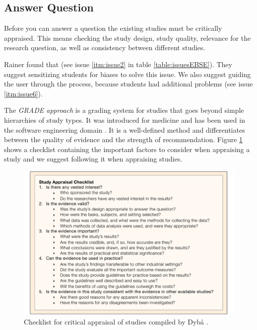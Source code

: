 
\subsection{Answer Question}
\label{subsec:answer question}

Before you can answer a question the existing studies must be critically appraised. This means checking the study design, study quality, relevance for the research question, as well as consistency between different studies. 

Rainer \etal found that  \cite{Rainer2006} (see issue \ref{itm:issue2} in table \ref{table:issuesEBSE}). They suggest sensitizing students for biases to solve this issue. We also suggest guiding the user through the process, because students had additional problems (see issue \ref{itm:issue6}). 

The \emph{GRADE approach} \cite{Atkins2004} is a grading system for studies that goes beyond simple hierarchies of study types. It was introduced for medicine and has been used in the software engineering domain \cite{Wohlin2013EvidenceProfile,Dyba2008}. It is a well-defined method and differentiates between the quality of evidence and the strength of recommendation. Figure \ref{fig:critical appraisal} shows a checklist containing the important factors to consider when appraising a study and we suggest following it when appraising studies. 

\begin{figure}
	\centering
	\includegraphics[width=12cm]{figures/study_appraisal.pdf}
\caption{Checklist for critical appraisal of studies compiled by Dyb{\aa} \etal \cite{Dyba2005}.}
\label{fig:critical appraisal}
\end{figure}


